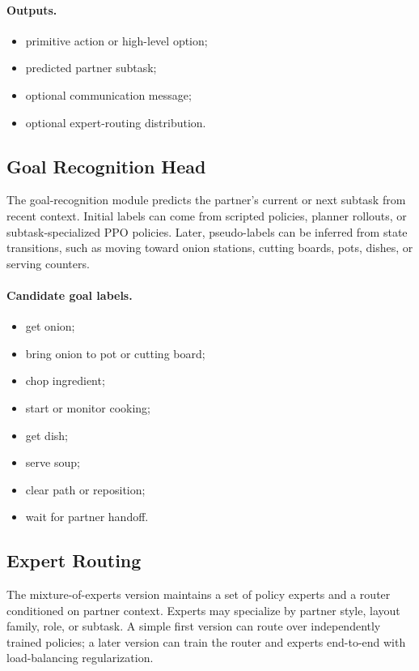 \documentclass[letterpaper]{article} %
\begin{document}
\paragraph{Outputs.}
\begin{itemize}
    \item primitive action or high-level option;
    \item predicted partner subtask;
    \item optional communication message;
    \item optional expert-routing distribution.
\end{itemize}

\subsection{Goal Recognition Head}

The goal-recognition module predicts the partner's current or next subtask from recent context. Initial labels can come from scripted policies, planner rollouts, or subtask-specialized PPO policies. Later, pseudo-labels can be inferred from state transitions, such as moving toward onion stations, cutting boards, pots, dishes, or serving counters.

\paragraph{Candidate goal labels.}
\begin{itemize}
    \item get onion;
    \item bring onion to pot or cutting board;
    \item chop ingredient;
    \item start or monitor cooking;
    \item get dish;
    \item serve soup;
    \item clear path or reposition;
    \item wait for partner handoff.
\end{itemize}

\subsection{Expert Routing}

The mixture-of-experts version maintains a set of policy experts and a router conditioned on partner context. Experts may specialize by partner style, layout family, role, or subtask. A simple first version can route over independently trained policies; a later version can train the router and experts end-to-end with load-balancing regularization.
\end{document}
